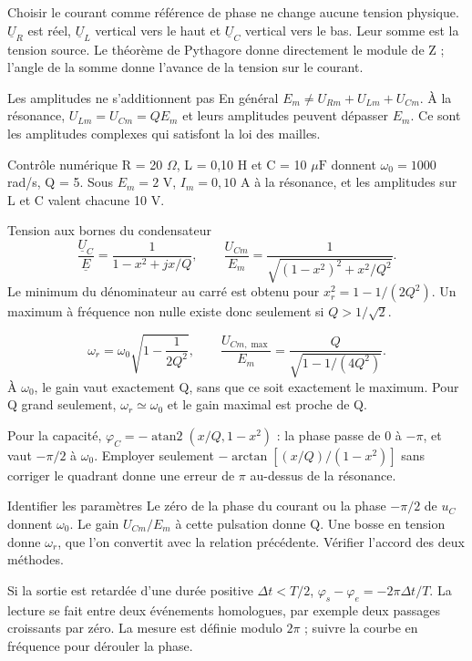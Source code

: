 Choisir le courant comme référence de phase ne change aucune tension physique. $\underline U_R$ est réel, $\underline U_L$ vertical vers le haut et $\underline U_C$ vertical vers le bas. Leur somme est la tension source. Le théorème de Pythagore donne directement le module de Z ; l’angle de la somme donne l’avance de la tension sur le courant.
\begin{piege}{Les amplitudes ne s’additionnent pas}
En général $E_m\neq U_{Rm}+U_{Lm}+U_{Cm}$. À la résonance, $U_{Lm}=U_{Cm}=QE_m$ et leurs amplitudes peuvent dépasser $E_m$. Ce sont les amplitudes complexes qui satisfont la loi des mailles.
\end{piege}
\begin{methode}{Contrôle numérique}
R = 20 $\Omega$, L = 0,10 H et C = 10 $\mu\mathrm F$ donnent $\omega_0=1000$ rad/s, Q = 5. Sous $E_m=2$ V, $I_m=0{,}10$ A à la résonance, et les amplitudes sur L et C valent chacune 10 V.
\end{methode}


\begin{loi}{Tension aux bornes du condensateur}
\[\frac{\underline U_C}{\underline E}=\frac1{1-x^2+jx/Q},\qquad \frac{U_{Cm}}{E_m}=\frac1{\sqrt{(1-x^2)^2+x^2/Q^2}}.\]Le minimum du dénominateur au carré est obtenu pour $x_r^2=1-1/(2Q^2)$. Un maximum à fréquence non nulle existe donc seulement si $Q>1/\sqrt2$.
\end{loi}
\[\omega_r=\omega_0\sqrt{1-\frac1{2Q^2}},\qquad \frac{U_{Cm,\max}}{E_m}=\frac Q{\sqrt{1-1/(4Q^2)}}.\]À $\omega_0$, le gain vaut exactement Q, sans que ce soit exactement le maximum. Pour Q grand seulement, $\omega_r\simeq\omega_0$ et le gain maximal est proche de Q.


Pour la capacité, $\varphi_C=-\operatorname{atan2}(x/Q,1-x^2)$ : la phase passe de 0 à $-\pi$, et vaut $-\pi/2$ à $\omega_0$. Employer seulement $-\arctan[(x/Q)/(1-x^2)]$ sans corriger le quadrant donne une erreur de $\pi$ au-dessus de la résonance.
\begin{methode}{Identifier les paramètres}
Le zéro de la phase du courant ou la phase $-\pi/2$ de $u_C$ donnent $\omega_0$. Le gain $U_{Cm}/E_m$ à cette pulsation donne Q. Une bosse en tension donne $\omega_r$, que l’on convertit avec la relation précédente. Vérifier l’accord des deux méthodes.
\end{methode}
Si la sortie est retardée d’une durée positive $\Delta t<T/2$, $\varphi_s-\varphi_e=-2\pi\Delta t/T$. La lecture se fait entre deux événements homologues, par exemple deux passages croissants par zéro. La mesure est définie modulo $2\pi$ ; suivre la courbe en fréquence pour dérouler la phase.


